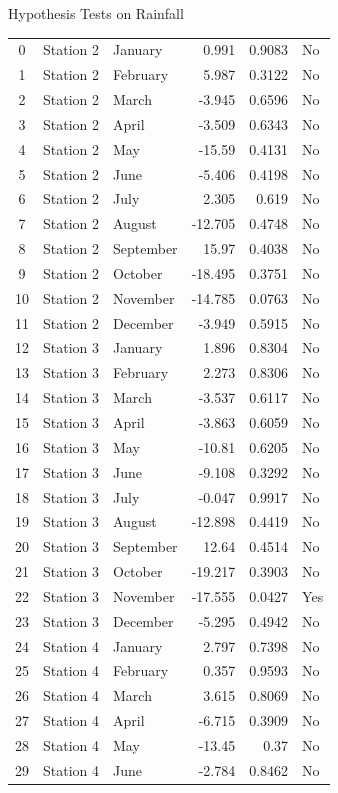 \documentclass[12pt]{article}
\theoremstyle{definition}
\begin{document}
\begin{section}{Hypothesis Tests on Rainfall}
\begin{longtable}{|c|l|l|r|r|l|}
0 & Station 2 & January & 0.991 & 0.9083 & No \\
1 & Station 2 & February & 5.987 & 0.3122 & No \\
2 & Station 2 & March & -3.945 & 0.6596 & No \\
3 & Station 2 & April & -3.509 & 0.6343 & No \\
4 & Station 2 & May & -15.59 & 0.4131 & No \\
5 & Station 2 & June & -5.406 & 0.4198 & No \\
6 & Station 2 & July & 2.305 & 0.619 & No \\
7 & Station 2 & August & -12.705 & 0.4748 & No \\
8 & Station 2 & September & 15.97 & 0.4038 & No \\
9 & Station 2 & October & -18.495 & 0.3751 & No \\
10 & Station 2 & November & -14.785 & 0.0763 & No \\
11 & Station 2 & December & -3.949 & 0.5915 & No \\
12 & Station 3 & January & 1.896 & 0.8304 & No \\
13 & Station 3 & February & 2.273 & 0.8306 & No \\
14 & Station 3 & March & -3.537 & 0.6117 & No \\
15 & Station 3 & April & -3.863 & 0.6059 & No \\
16 & Station 3 & May & -10.81 & 0.6205 & No \\
17 & Station 3 & June & -9.108 & 0.3292 & No \\
18 & Station 3 & July & -0.047 & 0.9917 & No \\
19 & Station 3 & August & -12.898 & 0.4419 & No \\
20 & Station 3 & September & 12.64 & 0.4514 & No \\
21 & Station 3 & October & -19.217 & 0.3903 & No \\
22 & Station 3 & November & -17.555 & 0.0427 & Yes \\
23 & Station 3 & December & -5.295 & 0.4942 & No \\
24 & Station 4 & January & 2.797 & 0.7398 & No \\
25 & Station 4 & February & 0.357 & 0.9593 & No \\
26 & Station 4 & March & 3.615 & 0.8069 & No \\
27 & Station 4 & April & -6.715 & 0.3909 & No \\
28 & Station 4 & May & -13.45 & 0.37 & No \\
29 & Station 4 & June & -2.784 & 0.8462 & No \\

\end{longtable}
\end{section}
\end{document}
